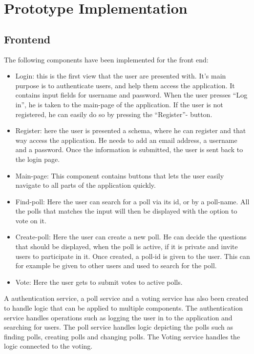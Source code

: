 \clearpage
\section{Prototype Implementation}
\label{sec:implementation}

\subsection{Frontend}
The following components have been implemented for the front end:

\begin{itemize}
	\item Login: this is the first view that the user are presented with. It’s main purpose is to
authenticate users, and help them access the application. It contains input fields for
username and password. When the user presses “Log in”, he is taken to the main-page of the
application. If the user is not registered, he can easily do so by pressing the “Register”-
button.
	\item Register: here the user is presented a schema, where he can register and that way access the
application. He needs to add an email address, a username and a password. Once the
information is submitted, the user is sent back to the login page.
	\item Main-page: This component contains buttons that lets the user easily navigate to all parts of
the application quickly.
	\item Find-poll: Here the user can search for a poll via its id, or by a poll-name. All the polls that
matches the input will then be displayed with the option to vote on it.
	\item Create-poll: Here the user can create a new poll. He can decide the questions that should be
displayed, when the poll is active, if it is private and invite users to participate in it. Once
created, a poll-id is given to the user. This can for example be given to other users and used
to search for the poll.
	\item Vote: Here the user gets to submit votes to active polls.
\end{itemize}

A authentication service, a poll service and a voting service has also been created to handle logic that
can be applied to multiple components. The authentication service handles operations such as
logging the user in to the application and searching for users. The poll service handles logic depicting
the polls such as finding polls, creating polls and changing polls. The Voting service handles the logic
connected to the voting.

